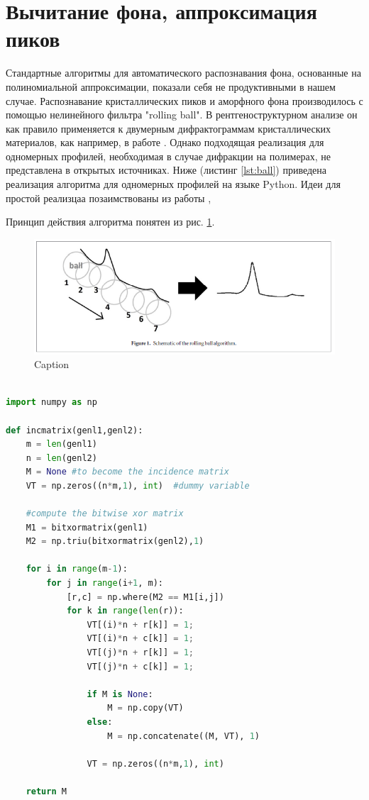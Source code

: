 	\section{Вычитание фона, аппроксимация пиков}
	Стандартные алгоритмы для автоматического распознавания фона, основанные на полиномиальной аппроксимации, показали себя не продуктивными в нашем случае. Распознавание кристаллических пиков и аморфного фона производилось с помощью нелинейного фильтра "rolling ball". В рентгеноструктурном анализе он как правило применяется к двумерным дифрактограммам кристаллических материалов, как например, в работе \cite{ball2018}. Однако подходящая реализация для одномерных профилей, необходимая в случае дифракции на полимерах, не представлена в открытых источниках. Ниже (листинг \ref{lst:ball}) приведена реализация алгоритма для одномерных профилей на языке Python. 
	Идеи для простой реализцаа позаимствованы из работы \cite{ball-code},  
	
	Принцип действия алгоритма понятен из рис. \ref{fig:ball}. 
	
	\begin{figure}[h]
	    \centering
	    \includegraphics[width=\linewidth]{fig/ball.PNG}
	    \caption{Caption}
	    \label{fig:ball}
	\end{figure}
	  
	
	\begin{lstlisting}[language=Python, caption=Python example, label={lst:ball}]
	
import numpy as np
 
def incmatrix(genl1,genl2):
    m = len(genl1)
    n = len(genl2)
    M = None #to become the incidence matrix
    VT = np.zeros((n*m,1), int)  #dummy variable
 
    #compute the bitwise xor matrix
    M1 = bitxormatrix(genl1)
    M2 = np.triu(bitxormatrix(genl2),1) 
 
    for i in range(m-1):
        for j in range(i+1, m):
            [r,c] = np.where(M2 == M1[i,j])
            for k in range(len(r)):
                VT[(i)*n + r[k]] = 1;
                VT[(i)*n + c[k]] = 1;
                VT[(j)*n + r[k]] = 1;
                VT[(j)*n + c[k]] = 1;
 
                if M is None:
                    M = np.copy(VT)
                else:
                    M = np.concatenate((M, VT), 1)
 
                VT = np.zeros((n*m,1), int)
 
    return M
\end{lstlisting}
	

